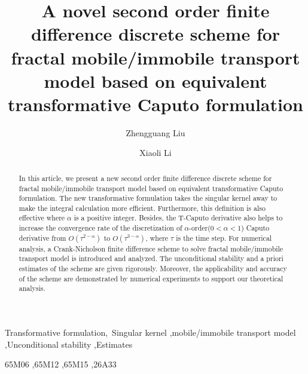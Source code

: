 \documentclass[3p,times]{elsarticle}
\begin{document}
\newtheorem{thm}{Theorem}
\newtheorem{lem}[thm]{Lemma}
\newtheorem{defn}[thm]{Definition}
\begin{frontmatter}



\title{A novel second order finite difference discrete scheme for fractal mobile/immobile transport model based on equivalent transformative Caputo formulation}

 \author[label1]{Zhengguang Liu}
 \author[label1]{Xiaoli Li}
 \address[label1]{School of Mathematics, Shandong University, Jinan, Shandong 250100, China.}




\begin{abstract}
In this article, we present a new second order finite difference discrete scheme for fractal mobile/immobile transport model based on equivalent transformative Caputo formulation. The new transformative formulation takes the singular kernel away to make the integral calculation more efficient. Furthermore, this definition is also effective where $\alpha$ is a positive integer. Besides, the T-Caputo derivative also helps to increase the convergence rate of the discretization of $\alpha$-order($0<\alpha<1$) Caputo derivative from $O(\tau^{2-\alpha})$ to $O(\tau^{3-\alpha})$, where $\tau$ is the time step. For numerical analysis, a Crank-Nicholson finite difference scheme to solve fractal mobile/immobile transport model is introduced and analyzed. The unconditional stability and a priori estimates of the scheme are given rigorously. Moreover, the applicability and accuracy of the scheme are demonstrated by numerical experiments to support our theoretical analysis.
\end{abstract}

\begin{keyword}


Transformative formulation\sep\ Singular kernel \sep mobile/immobile transport model \sep Unconditional stability \sep Estimates

\MSC[2010] 65M06 \sep 65M12 \sep 65M15 \sep 26A33
\end{keyword}

\end{frontmatter}
 \thispagestyle{empty}
\end{document}
